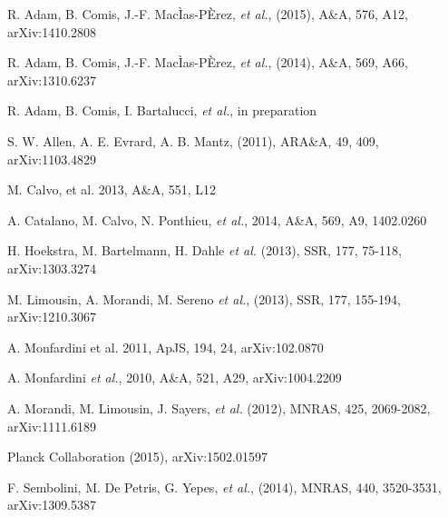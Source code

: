 \documentclass[11pt,a4paper,twoside,graphicx,color]{article}
\begin{document}
\begin{thebibliography}{9}

R. Adam, B. Comis, J.-F. MacÌas-PÈrez, {\it et al.}, (2015), A\&A, 576, A12, arXiv:1410.2808

R. Adam, B. Comis, J.-F. MacÌas-PÈrez, {\it et al.}, (2014), A\&A, 569, A66, arXiv:1310.6237

R. Adam, B. Comis, I. Bartalucci,  {\it et al.}, in preparation

S. W. Allen, A. E. Evrard, A. B. Mantz, (2011), ARA\&A, 49, 409, arXiv:1103.4829

M. Calvo, et al. 2013, A\&A, 551, L12

A. Catalano, M. Calvo, N. Ponthieu, {\it et al.}, 2014, A\&A, 569, A9, 1402.0260

H. Hoekstra, M. Bartelmann, H. Dahle {\it et al.} (2013), SSR, 177, 75-118, arXiv:1303.3274

M. Limousin, A. Morandi, M. Sereno {\it et al.}, (2013), SSR, 177, 155-194, arXiv:1210.3067

A. Monfardini et al. 2011, ApJS, 194, 24, arXiv:102.0870

A. Monfardini {\it et al.}, 2010, A\&A, 521, A29, arXiv:1004.2209

A. Morandi, M. Limousin, J. Sayers, {\it et al.} (2012), MNRAS, 425, 2069-2082, arXiv:1111.6189

Planck Collaboration (2015), arXiv:1502.01597

F. Sembolini, M. De Petris, G. Yepes, {\it et al.}, (2014), MNRAS, 440, 3520-3531, arXiv:1309.5387

\end{thebibliography}
\end{document}
